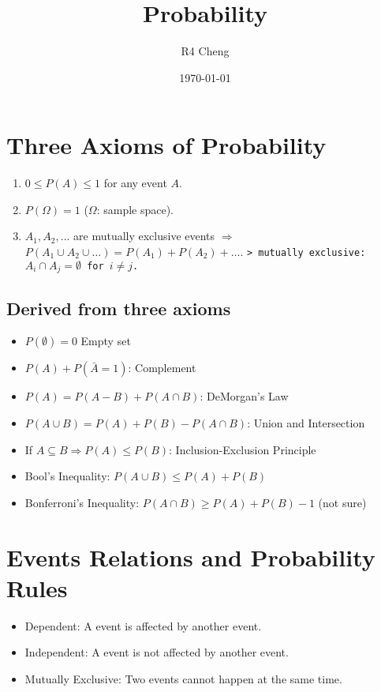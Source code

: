 \documentclass[12pt,a4paper]{article}
\title{Probability}
\author{R4 Cheng}
\date{\today}
\begin{document}
\maketitle

\section*{Three Axioms of Probability}

\begin{enumerate}
    \item $0 \leq P(A) \leq 1$ for any event $A$.
    \item $P(\Omega) = 1$ ($\Omega$: sample space).
    \item $A_1, A_2, \dots$ are mutually exclusive events $\Rightarrow$ $P(A_1 \cup A_2 \cup \dots) = P(A_1) + P(A_2) + \dots$.
    \texttt{> mutually exclusive: $A_i \cap A_j = \emptyset$ for $i \neq j$.}
\end{enumerate}

\subsection*{Derived from three axioms}

\begin{itemize}
    \item $P(\emptyset) = 0$ Empty set
    \item $P(A) + P(\bar{A} = 1)$: Complement
    \item $P(A) = P(A - B) + P(A \cap B)$: DeMorgan's Law
    \item $P(A \cup B) = P(A) + P(B) - P(A \cap B)$: Union and Intersection
    \item If $A \subseteq B \Rightarrow P(A) \leq P(B)$: Inclusion-Exclusion Principle
    \item Bool's Inequality: $P(A \cup B) \leq P(A) + P(B)$
    \item Bonferroni's Inequality: $P(A \cap B) \geq P(A) + P(B) - 1$ (not sure)
\end{itemize}

\section*{Events Relations and Probability Rules}

\begin{itemize}
    \item Dependent: A event is affected by another event.
    \item Independent: A event is not affected by another event.
    \item Mutually Exclusive: Two events cannot happen at the same time.
\end{itemize}
\end{document}
